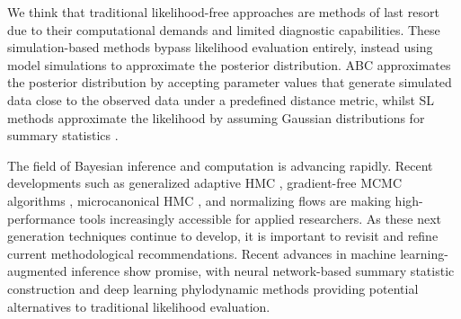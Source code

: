 \documentclass{article}
\begin{document}
We think that traditional likelihood-free approaches are methods of last resort due to their computational demands and limited diagnostic capabilities.
These simulation-based methods bypass likelihood evaluation entirely, instead using model simulations to approximate the posterior distribution.
\ac{ABC} approximates the posterior distribution by accepting parameter values that generate simulated data close to the observed data under a predefined distance metric, whilst \ac{SL} methods approximate the likelihood by assuming Gaussian distributions for summary statistics \citep{beaumont2002approximate, wood2010statistical, price2018bayesian}. 

The field of Bayesian inference and computation is advancing rapidly. Recent developments such as generalized adaptive \ac{HMC} \citep{bou2025within}, gradient-free \ac{MCMC} algorithms \citep{bou2025no}, microcanonical \ac{HMC} \citep{robnik2023microcanonical}, and normalizing flows \citep{papamakarios2021normalizing} are making high-performance tools increasingly accessible for applied researchers. As these next generation techniques continue to develop, it is important to revisit and refine current methodological recommendations. Recent advances in machine learning-augmented inference show promise, with neural network-based summary statistic construction \citep{raynal2019abc} and deep learning phylodynamic methods \citep{voznica2022deep} providing potential alternatives to traditional likelihood evaluation.
\end{document}
